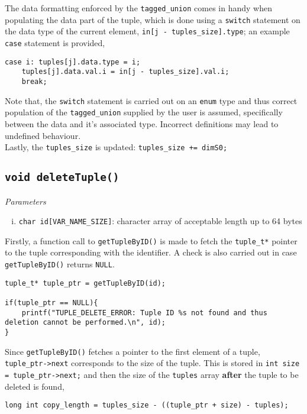 \documentclass[10pt, a4paper, oneside]{memoir}
\begin{document}
	The data formatting enforced by the \texttt{tagged_union} comes in handy when populating the data part of the tuple, which is done using a \texttt{switch} statement on the data type of the current element, \texttt{in[j - tuples_size].type}; an example \texttt{case} statement is provided,

\newpage

\begin{verbatim}
case i: tuples[j].data.type = i;
	tuples[j].data.val.i = in[j - tuples_size].val.i;
	break;
\end{verbatim}

	Note that, the \texttt{switch} statement is carried out on an \texttt{enum} type and thus correct population of the \texttt{tagged_union} supplied by the user is assumed, specifically between the data and it's associated type. Incorrect definitions may lead to undefined behaviour.\\

Lastly, the \texttt{tuples_size} is updated: \texttt{tuples_size += dimS0;}

\subsection{\texttt{void deleteTuple()}}
	
	\textit{Parameters}
	\begin{enumerate}[i.]
		\item \texttt{char id[VAR_NAME_SIZE]}: character array of acceptable length up to 64 bytes
	\end{enumerate}

	Firstly, a function call to \texttt{getTupleByID()} is made to fetch the \texttt{tuple_t*} pointer to the tuple corresponding with the identifier. A check is also carried out in case \texttt{getTupleByID()} returns \texttt{NULL}. 
	
\begin{verbatim}
tuple_t* tuple_ptr = getTupleByID(id);
	
if(tuple_ptr == NULL){
	printf("TUPLE_DELETE_ERROR: Tuple ID %s not found and thus deletion cannot be performed.\n", id);
}
\end{verbatim}

	Since \texttt{getTupleByID()} fetches a pointer to the first element of a tuple, \texttt{tuple_ptr->next} corresponds to the size of the tuple. This is stored in \texttt{int size = tuple_ptr->next;} and then the size of the \texttt{tuples} array \textbf{after} the tuple to be deleted is found,
\begin{verbatim}
long int copy_length = tuples_size - ((tuple_ptr + size) - tuples);
\end{verbatim}
\end{document}
